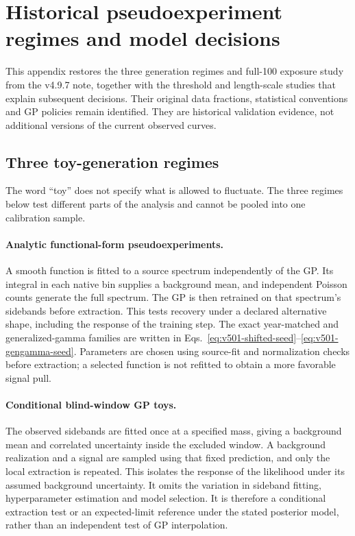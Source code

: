 \section{Historical pseudoexperiment regimes and model decisions}
\label{app:v501-historical-methods}
This appendix restores the three generation regimes and full-100 exposure
study from the v4.9.7 note, together with the threshold and length-scale
studies that explain subsequent decisions. Their original data fractions,
statistical conventions and GP policies remain identified. They are
historical validation evidence, not additional versions of the current
observed curves.

\subsection{Three toy-generation regimes}
\label{sec:v501-toy-regimes}
The word ``toy'' does not specify what is allowed to fluctuate. The three
regimes below test different parts of the analysis and cannot be pooled
into one calibration sample.

\paragraph{Analytic functional-form pseudoexperiments.}
A smooth function is fitted to a source spectrum independently of the GP.
Its integral in each native bin supplies a background mean, and independent
Poisson counts generate the full spectrum. The GP is then retrained on
that spectrum's sidebands before extraction. This tests recovery under a
declared alternative shape, including the response of the training step.
The exact year-matched and generalized-gamma families are written in
Eqs.~\ref{eq:v501-shifted-seed}--\ref{eq:v501-gengamma-seed}. Parameters
are chosen using source-fit and normalization checks before extraction;
a selected function is not refitted to obtain a more favorable signal pull.

\paragraph{Conditional blind-window GP toys.}
The observed sidebands are fitted once at a specified mass, giving a
background mean and correlated uncertainty inside the excluded window.
A background realization and a signal are sampled using that fixed
prediction, and only the local extraction is repeated. This isolates the
response of the likelihood under its assumed background uncertainty.
It omits the variation in sideband fitting, hyperparameter estimation and
model selection. It is therefore a conditional extraction test or an
expected-limit reference under the stated posterior model, rather than
an independent test of GP interpolation.

